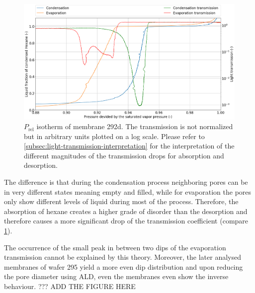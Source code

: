 \documentclass[../thesis.tex]{subfiles}
\begin{document}
                \begin{figure}[ht]
                    \centering
                    \includegraphics[width=\textwidth]{images/transmission_magnitude.png}
                    \caption{$P_\mathrm{rel}$ isotherm of membrane 292d. The transmission is not normalized but in arbitrary units plotted on a log scale. Please refer to \cref{subsec:light-transmission-interpretation} for the interpretation of the different magnitudes of the transmission drops for absorption and desorption. }
                    \label{fig:transmission-drops}
                \end{figure}

                The difference is that during the condensation process neighboring pores can be in very different states meaning empty and filled, while for evaporation the pores only show different levels of liquid during most of the process. Therefore, the absorption of hexane creates a higher grade of disorder than the desorption and therefore causes a more significant drop of the transmission coefficient (compare \cref{fig:transmission-drops}).
                \medskip

                The occurrence of the small peak in between two dips of the evaporation transmission cannot be explained by this theory. Moreover, the later analysed membranes of wafer 295 yield a more even dip distribution and upon reducing the pore diameter using ALD, even the membranes even show the inverse behaviour. ??? ADD THE FIGURE HERE
\end{document}
